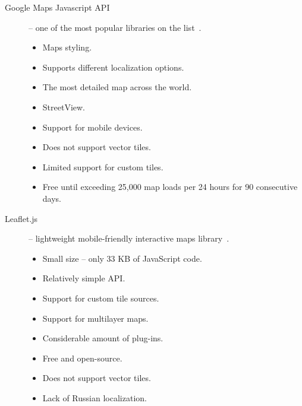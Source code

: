 \begin{description}

  \item[Google Maps Javascript API] -- one of the most popular libraries
    on the list~\cite{google:maps}. \\
    \underline{}
    \begin{itemize}
      \item Maps styling.
      \item Supports different localization options.
      \item The most detailed map across the world.
      \item StreetView.
      \item Support for mobile devices.
    \end{itemize}

    \underline{}
    \begin{itemize}
      \item Does not support vector tiles.
      \item Limited support for custom tiles.
      \item Free until exceeding 25,000 map loads per 24 hours for 90 consecutive days.
    \end{itemize}

  \item[Leaflet.js] -- lightweight mobile-friendly interactive maps
    library~\cite{leaflet}. \\
    \underline{}
    \begin{itemize}
      \item Small size -- only 33 KB of JavaScript code.
      \item Relatively simple API.
      \item Support for custom tile sources.
      \item Support for multilayer maps.
      \item Considerable amount of plug-ins.
      \item Free and open-source.
    \end{itemize}

    \underline{}
    \begin{itemize}
      \item Does not support vector tiles.
      \item Lack of Russian localization.
    \end{itemize}


\end{description}
